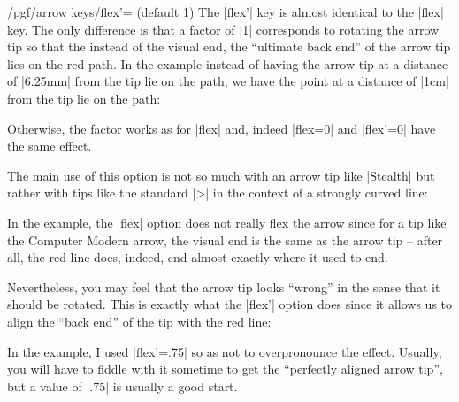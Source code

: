 \begin{key}{/pgf/arrow keys/flex'= (default 1)}
    The |flex'| key is almost identical to the |flex| key. The only difference
    is that a factor of |1| corresponds to rotating the arrow tip so that the
    instead of the visual end, the ``ultimate back end'' of the arrow tip lies
    on the red path. In the example instead of having the arrow tip at a
    distance of |6.25mm| from the tip lie on the path, we have the point at a
    distance of |1cm| from the tip lie on the path:
\begin{codeexample}[]
\end{codeexample}
    Otherwise, the factor works as for |flex| and, indeed |flex=0| and
    |flex'=0| have the same effect.

    The main use of this option is not so much with an arrow tip like |Stealth|
    but rather with tips like the standard |>| in the context of a strongly
    curved line:
\begin{codeexample}[]
\end{codeexample}
    In the example, the |flex| option does not really flex the arrow since for
    a tip like the Computer Modern arrow, the visual end is the same as the
    arrow tip -- after all, the red line does, indeed, end almost exactly where
    it used to end.

    Nevertheless, you may feel that the arrow tip looks ``wrong'' in the sense
    that it should be rotated. This is exactly what the |flex'| option does
    since it allows us to align the ``back end'' of the tip with the red line:
\begin{codeexample}[]
\end{codeexample}
    In the example, I used |flex'=.75| so as not to overpronounce the effect.
    Usually, you will have to fiddle with it sometime to get the ``perfectly
    aligned arrow tip'', but a value of |.75| is usually a good start.
\end{key}

